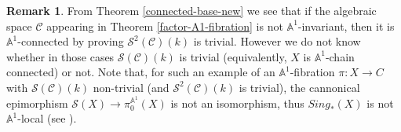 \documentclass[11pt, reqno]{amsart}
\theoremstyle{plain}
\theoremstyle{definition}
\newtheorem{remark}[thm]{Remark}
\newcommand{\sC}{{\mathcal C}}
\newcommand{\sS}{{\mathcal S}}
\newcommand{\A}{{\mathbb A}}
\begin{document}

			\begin{remark}
 From Theorem \ref{connected-base-new} we see that if the algebraic space $\sC$ appearing in Theorem \ref{factor-A1-fibration} is not $\A^1$-invariant, then it is $\A^1$-connected by proving $\sS^2(\sC)(k)$ is trivial. %
 However we do not know whether in those cases $\sS(\sC)(k)$ is trivial (equivalently, $X$ is $\A^1$-chain connected) or not. Note that, for such an example of an $\A^1$-fibration $\pi:X \to C$ with $\sS(\sC)(k)$ non-trivial (and $\sS^2(\sC)(k)$ is trivial), the cannonical epimorphism $\sS(X)\to \pi_0^{\A^1}(X)$ is not an isomorphism, thus $Sing_*(X)$ is not $\A^1$-local (see \cite[Conjecture 2.2.8]{am}).
\end{remark} 
\end{document}
